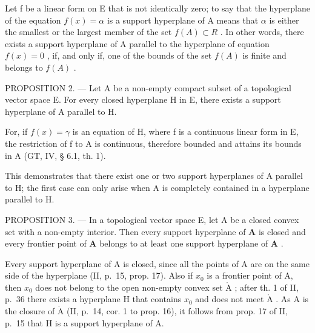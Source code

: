 Let f be a linear form on E that is not identically zero; to say that the hyperplane of the equation \(f(x) = \alpha\) is a support hyperplane of A means that \(\alpha\) is either the smallest or the largest member of the set \(f(A) \subset R\) . In other words, there exists a support hyperplane of A parallel to the hyperplane of equation \(f(x) = 0\) , if, and only if, one of the bounds of the set \(f(A)\) is finite and belongs to \(f(A)\) .

PROPOSITION 2. --- Let A be a non-empty compact subset of a topological vector space E. For every closed hyperplane H in E, there exists a support hyperplane of A parallel to H.

For, if \(f(x) = \gamma\) is an equation of H, where f is a continuous linear form in E, the restriction of f to A is continuous, therefore bounded and attains its bounds in A (GT, IV, § 6.1, th. 1).

This demonstrates that there exist one or two support hyperplanes of A parallel to H; the first case can only arise when A is completely contained in a hyperplane parallel to H.

PROPOSITION 3. --- In a topological vector space E, let A be a closed convex set with a non-empty interior. Then every support hyperplane of \(\mathbf{A}\) is closed and every frontier point of \(\mathbf{A}\) belongs to at least one support hyperplane of \(\mathbf{A}\) .

Every support hyperplane of A is closed, since all the points of A are on the same side of the hyperplane (II, p.~15, prop. 17). Also if \(x_0\) is a frontier point of A, then \(x_0\) does not belong to the open non-empty convex set \(\mathring{\mathrm{A}}\) ; after th. 1 of II, p.~36 there exists a hyperplane H that contains \(x_0\) and does not meet \(\mathring{\mathrm{A}}\) . As A is the closure of \(\mathring{\mathrm{A}}\) (II, p.~14, cor. 1 to prop. 16), it follows from prop. 17 of II, p.~15 that H is a support hyperplane of A.

